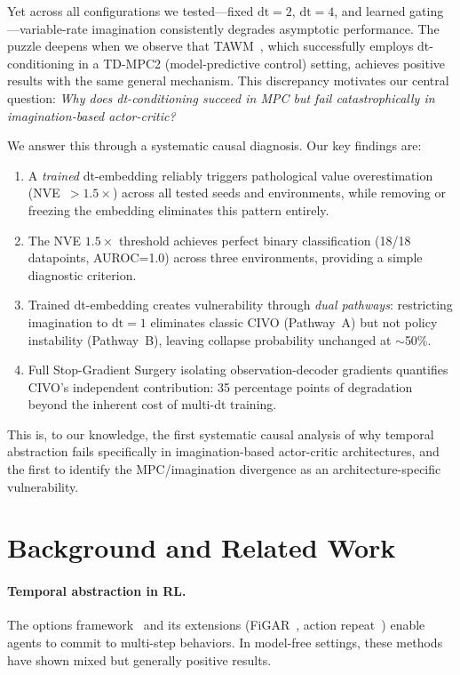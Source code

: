 \documentclass[10pt,letterpaper]{article}
\begin{document}
Yet across all configurations we tested---fixed $\mathrm{dt}=2$, $\mathrm{dt}=4$, and learned gating---variable-rate imagination consistently degrades asymptotic performance.
The puzzle deepens when we observe that TAWM~\cite{nhu2025tawm}, which successfully employs dt-conditioning in a TD-MPC2 (model-predictive control) setting, achieves positive results with the same general mechanism.
This discrepancy motivates our central question: \emph{Why does dt-conditioning succeed in MPC but fail catastrophically in imagination-based actor-critic?}

We answer this through a systematic causal diagnosis.
Our key findings are:
\begin{enumerate}
    \item A \emph{trained} dt-embedding reliably triggers pathological value overestimation (NVE~$>1.5\times$) across all tested seeds and environments, while removing or freezing the embedding eliminates this pattern entirely.
    \item The NVE $1.5\times$ threshold achieves perfect binary classification (18/18 datapoints, AUROC=1.0) across three environments, providing a simple diagnostic criterion.
    \item Trained dt-embedding creates vulnerability through \emph{dual pathways}: restricting imagination to $\mathrm{dt}=1$ eliminates classic CIVO (Pathway~A) but not policy instability (Pathway~B), leaving collapse probability unchanged at $\sim$50\%.
    \item Full Stop-Gradient Surgery isolating observation-decoder gradients quantifies CIVO's independent contribution: 35 percentage points of degradation beyond the inherent cost of multi-dt training.
\end{enumerate}

This is, to our knowledge, the first systematic causal analysis of why temporal abstraction fails specifically in imagination-based actor-critic architectures, and the first to identify the MPC/imagination divergence as an architecture-specific vulnerability.

\section{Background and Related Work}

\paragraph{Temporal abstraction in RL.}
The options framework~\cite{sutton1999options} and its extensions (FiGAR~\cite{sharma2017figar}, action repeat~\cite{lakshminarayanan2017dynamic}) enable agents to commit to multi-step behaviors.
In model-free settings, these methods have shown mixed but generally positive results.
\end{document}

